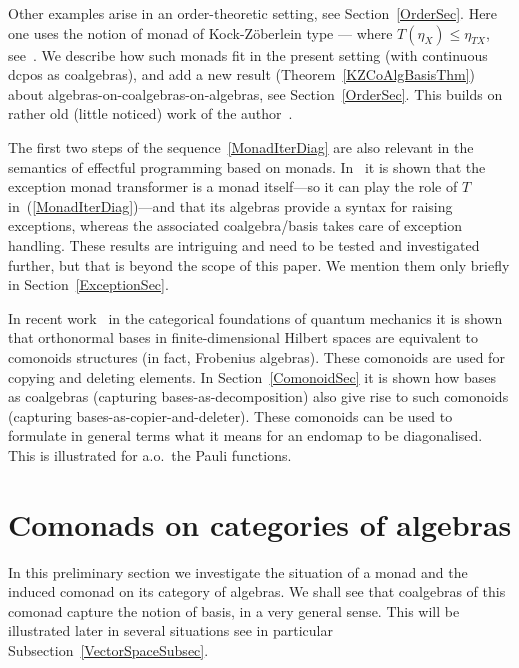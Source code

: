 \documentclass{LMCS}
\begin{document}
Other examples arise in an order-theoretic setting, see
Section~\ref{OrderSec}.  Here one uses the notion of monad of
Kock-Z{\"o}berlein type --- where $T(\eta_{X}) \leq \eta_{TX}$,
see~\cite{Kock95,Escardo98}. We describe how such monads fit in the
present setting (with continuous dcpos as coalgebras), and add a new
result (Theorem~\ref{KZCoAlgBasisThm}) about
algebras-on-coalgebras-on-algebras, see Section~\ref{OrderSec}.  This
builds on rather old (little noticed) work of the
author~\cite{Jacobs94b}.

The first two steps of the sequence~\eqref{MonadIterDiag} are also
relevant in the semantics of effectful programming based on monads.
In~\cite{Levy06} it is shown that the exception monad transformer is a
monad itself---so it can play the role of $T$
in~(\ref{MonadIterDiag})---and that its algebras provide a syntax for
raising exceptions, whereas the associated coalgebra/basis takes care
of exception handling. These results are intriguing and need to be
tested and investigated further, but that is beyond the scope of this
paper.  We mention them only briefly in Section~\ref{ExceptionSec}.

In recent work~\cite{CoeckePV12} in the categorical foundations of
quantum mechanics it is shown that orthonormal bases in
finite-dimensional Hilbert spaces are equivalent to comonoids
structures (in fact, Frobenius algebras). These como\-noids are used
for copying and deleting elements. In Section~\ref{ComonoidSec} it is
shown how bases as coalgebras (capturing bases-as-decomposition) also
give rise to such comonoids (capturing
bases-as-copier-and-deleter). These comonoids can be used to formulate
in general terms what it means for an endomap to be diagonalised. This
is illustrated for a.o.\ the Pauli functions.



\section{Comonads on categories of algebras}\label{ComonadSec}

In this preliminary section we investigate the situation of a monad
and the induced comonad on its category of algebras. We shall see that
coalgebras of this comonad capture the notion of basis, in a very
general sense. This will be illustrated later in several situations
see in particular Subsection~\ref{VectorSpaceSubsec}.
\end{document}
